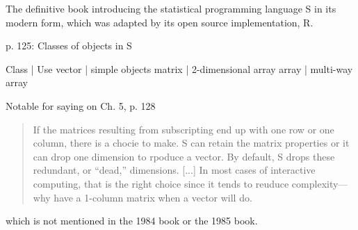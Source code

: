 The definitive book introducing the statistical programming language S in its
modern form, which was adapted by its open source implementation, R.

p. 125: Classes of objects in S

Class | Use
vector | simple objects
matrix | 2-dimensional array
array | multi-way array

Notable for saying on Ch. 5, p. 128

\begin{quote}
If the matrices resulting from subscripting end up with one row or one
column, there is a chocie to make. S can retain the matrix properties or it can
drop one dimension to rpoduce a vector. By default, S drops these redundant,
or ``dead,'' dimensions. [...]
In most cases of interactive computing, that is the right choice since it tends to
reuduce complexity---why have a 1-column matrix when a vector will do.
\end{quote}

which is not mentioned in the 1984 book or the 1985 book.
